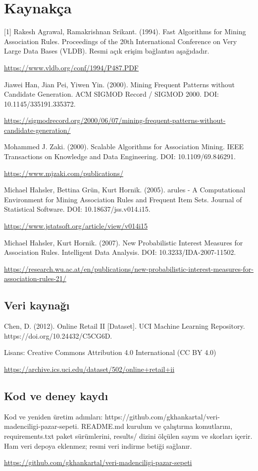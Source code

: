 \documentclass[conference,a4paper]{IEEEtran}
\begin{document}
\clearpage
\label{content-end}
\section*{Kaynakça}
\label{references-start}
[1] Rakesh Agrawal, Ramakrishnan Srikant. (1994). Fast Algorithms for Mining Association Rules. Proceedings of the 20th International Conference on Very Large Data Bases (VLDB).  Resmi açık erişim bağlantısı aşağıdadır.

\noindent\url{https://www.vldb.org/conf/1994/P487.PDF}
\par
[2] Jiawei Han, Jian Pei, Yiwen Yin. (2000). Mining Frequent Patterns without Candidate Generation. ACM SIGMOD Record / SIGMOD 2000.  DOI: 10.1145/335191.335372.

\noindent\url{https://sigmodrecord.org/2000/06/07/mining-frequent-patterns-without-candidate-generation/}
\par
[3] Mohammed J. Zaki. (2000). Scalable Algorithms for Association Mining. IEEE Transactions on Knowledge and Data Engineering.  DOI: 10.1109/69.846291.

\noindent\url{https://www.mjzaki.com/publications/}
\par
[4] Michael Hahsler, Bettina Grün, Kurt Hornik. (2005). arules - A Computational Environment for Mining Association Rules and Frequent Item Sets. Journal of Statistical Software.  DOI: 10.18637/jss.v014.i15.

\noindent\url{https://www.jstatsoft.org/article/view/v014i15}
\par
[5] Michael Hahsler, Kurt Hornik. (2007). New Probabilistic Interest Measures for Association Rules. Intelligent Data Analysis.  DOI: 10.3233/IDA-2007-11502.

\noindent\url{https://research.wu.ac.at/en/publications/new-probabilistic-interest-measures-for-association-rules-21/}
\par
\subsection{Veri kaynağı}
Chen, D. (2012). Online Retail II [Dataset]. UCI Machine Learning Repository. https://doi.org/10.24432/C5CG6D.

Lisans: Creative Commons Attribution 4.0 International (CC BY 4.0)

\noindent\url{https://archive.ics.uci.edu/dataset/502/online+retail+ii}
\par
\subsection{Kod ve deney kaydı}
Kod ve yeniden üretim adımları: https://github.com/gkhankartal/veri-madenciligi-pazar-sepeti. README.md kurulum ve çalıştırma komutlarını, requirements.txt paket sürümlerini, results/ dizini ölçülen sayım ve skorları içerir. Ham veri depoya eklenmez; resmi veri indirme betiği sağlanır.

\noindent\url{https://github.com/gkhankartal/veri-madenciligi-pazar-sepeti}
\par
\end{document}
